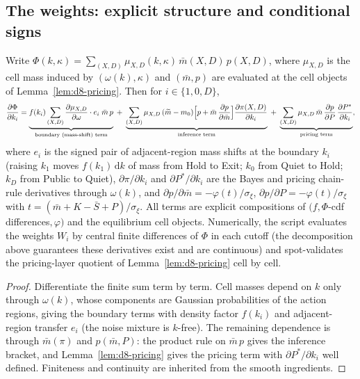 \subsection{The weights: explicit structure and conditional signs}

\begin{lemma}
\label{lem:d8-weights}
Write $\Phi(k,\kappa)=\sum_{(X,D)}\mu_{X,D}(k,\kappa)\,\bar m(X,D)\,p(X,D)$, where $\mu_{X,D}$ is the cell mass induced by $(\omega(k),\kappa)$ and $(\bar m,p)$ are evaluated at the cell objects of Lemma~\ref{lem:d8-pricing}. Then for $i\in\{1,0,D\}$,
\begin{equation}
\frac{\partial\Phi}{\partial k_i}
=\underbrace{f(k_i)\sum_{(X,D)}\frac{\partial\mu_{X,D}}{\partial\omega}\cdot e_i\;\bar m\,p}_{\textup{boundary (mass-shift) term}}
\;+\;\underbrace{\sum_{(X,D)}\mu_{X,D}\,(\widetilde{m}-m_0)\Big[p+\bar m\,\frac{\partial p}{\partial\bar m}\Big]\frac{\partial\pi(X,D)}{\partial k_i}}_{\textup{inference term}}
\;+\;\underbrace{\sum_{(X,D)}\mu_{X,D}\,\bar m\,\frac{\partial p}{\partial P}\,\frac{\partial P^{*}}{\partial k_i}}_{\textup{pricing term}},
\label{eq:d8-weights}
\end{equation}
where $e_i$ is the signed pair of adjacent-region mass shifts at the boundary $k_i$ (raising $k_1$ moves $f(k_1)\,\mathrm{d} k$ of mass from Hold to Exit; $k_0$ from Quiet to Hold; $k_D$ from Public to Quiet), $\partial\pi/\partial k_i$ and $\partial P^{*}/\partial k_i$ are the Bayes and pricing chain-rule derivatives through $\omega(k)$, and $\partial p/\partial\bar m=-\varphi(t)/\sigma_\xi$, $\partial p/\partial P=-\varphi(t)/\sigma_\xi$ with $t=(\bar m+K-\bar S+P)/\sigma_\xi$.
All terms are explicit compositions of $(f,\Phi$-cdf differences$,\varphi)$ and the equilibrium cell objects. Numerically, the script evaluates the weights $W_i$ by central finite differences of $\Phi$ in each cutoff (the decomposition above guarantees these derivatives exist and are continuous) and spot-validates the pricing-layer quotient of Lemma~\ref{lem:d8-pricing} cell by cell.
\end{lemma}

\begin{proof}
Differentiate the finite sum term by term. Cell masses depend on $k$ only through $\omega(k)$, whose components are Gaussian probabilities of the action regions, giving the boundary terms with density factor $f(k_i)$ and adjacent-region transfer $e_i$ (the noise mixture is $k$-free). The remaining dependence is through $\bar m(\pi)$ and $p(\bar m,P)$: the product rule on $\bar m\,p$ gives the inference bracket, and Lemma~\ref{lem:d8-pricing} gives the pricing term with $\partial P^{*}/\partial k_i$ well defined. Finiteness and continuity are inherited from the smooth ingredients.
\end{proof}


